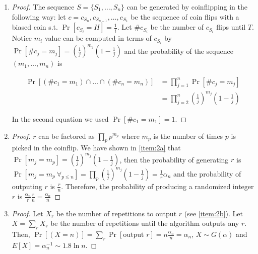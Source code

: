 \documentclass[12pt, a4paper]{article} %
\newcommand{\pr}[1]{\Pr[#1]}
\begin{document}
\begin{enumerate}[label=(\alph*)]
  \item\label{item:2a} \begin{proof}

      The sequence $S = \{S_1, \ldots, S_n\}$ can be generated by coinflipping in the following way: let $c = c_{S_n}, c_{S_{n-1}}, \ldots, c_{S_1}$ be the sequence of coin flips with a biased coin s.t. $\pr{c_{S_i} = H} = \frac{1}{i}$. Let $\#c_{S_i}$ be the number of $c_{S_i}$ flips until $T$. Notice $m_i$ value can be computed in terms of $c_{S_i}$ by $\pr{\#c_j = m_j} = (\frac{1}{j})^{m_j}(1 - \frac{1}{j})$ and the probability of the sequence $(m_1, \ldots, m_n)$ is

    \begin{align*}
      \pr{(\#c_1 = m_1) \cap \ldots \cap (\#c_n = m_n)} &= \prod_{j = 1}^n \pr{\#c_j = m_j} \\
      &= \prod_{j = 2}^n (\frac{1}{j})^{m_j}(1 - \frac{1}{j})
    \end{align*}

  In the second equation we used $\pr{\#c_1 = m_1} = 1$.

  \end{proof}

\item\label{item:2b} \begin{proof} $r$ can be factored as $\prod_p p^{m_p}$ where $m_p$ is the number of times $p$ is picked in the coinflip. We have shown in \ref{item:2a} that ${\pr{m_j = m_p}} = {(\frac{1}{j})^{m_j}(1 - \frac{1}{j})}$, then the probability of generating $r$ is $\pr{m_j = m_p \ \forall_{p \leq n}} = {\prod_p (\frac{1}{j})^{m_j}(1 - \frac{1}{j})} = \frac{1}{r}\alpha_n$ and the probability of outputing $r$ is $\frac{r}{n}$. Therefore, the probability of producing a randomized integer $r$ is $\frac{\alpha_n}{r} \frac{r}{n} = \frac{\alpha_n}{n}$

  \end{proof}

\item\label{item:2c} \begin{proof} Let $X_r$ be the number of repetitions to output $r$ (see \ref{item:2b}). Let $X = \sum_r X_r$ be the number of repetitions until the algorithm outputs any $r$. Then, $\pr{(X = n)} = \sum_r \pr{\text{output } r} = n\frac{\alpha_n}{n} = \alpha_n$, $X \sim G(\alpha)$ and $E[X] = \alpha_n^{-1} \sim 1.8 \ln n$.

  \end{proof}


\end{enumerate}
\end{document}
